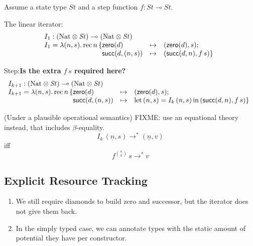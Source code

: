 \documentclass[acmsmall,review]{acmart}
\newcommand{\tmRec}{\mathrm{rec}}
\newcommand{\tyNat}{\mathrm{Nat}}
\newcommand{\conZero}{\mathsf{zero}}
\newcommand{\conSucc}{\mathsf{succ}}
\newcommand{\Let}{\mathrm{let}}
\newcommand{\In}{\mathrm{in}}
\begin{document}
Assume a state type $\mathit{St}$ and a step function $f : \mathit{St} \multimap \mathit{St}$.

The linear iterator:
\begin{displaymath}
  \begin{array}{l}
    I_1 : (\tyNat \otimes \mathit{St}) \multimap (\tyNat \otimes \mathit{St}) \\
    I_1 = \lambda (n, s).\,\tmRec\,n\,\{
    \begin{array}[t]{@{}lcl}
      \conZero(d)&\mapsto&(\conZero(d), s);\\
      \conSucc(d,(n,s)) &\mapsto& (\conSucc(d,n),f\,s) \}
    \end{array}
  \end{array}
\end{displaymath}

Step:\textbf{Is the extra $f\,s$ required here?}
\begin{displaymath}
  \begin{array}{l}
    I_{k+1} : (\tyNat \otimes \mathit{St}) \multimap (\tyNat \otimes \mathit{St}) \\
    I_{k+1} = \lambda (n,s).\,\tmRec\,n\,\{
    \begin{array}[t]{@{}lcl}
      \conZero(d)&\mapsto&(\conZero(d),s); \\
      \conSucc(d,(n,s)) &\mapsto& \Let\,(n,s)=I_k\,(n,s)\,\In\,(\conSucc(d,n), f\,s) \}
    \end{array}
  \end{array}
\end{displaymath}

\begin{lemma}
  (Under a plausible operational semantics) FIXME: use an equational
  theory instead, that includes $\beta$-equality.
  \begin{displaymath}
    I_k\,(\underline{n},s) \longrightarrow^* (\underline{n},v)
  \end{displaymath}
  iff
  \begin{displaymath}
    f^{\binom{n}{k}}\,s \longrightarrow^* v
  \end{displaymath}
\end{lemma}


\subsection{Explicit Resource Tracking}

\begin{enumerate}
\item We still require diamonds to build zero and successor, but the
  iterator does not give them back.
\item In the simply typed case, we can annotate types with the static
  amount of potential they have per constructor.
\end{enumerate}
\end{document}
